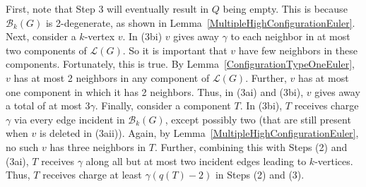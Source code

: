 \documentclass[12pt]{article}
\theoremstyle{plain}
\theoremstyle{definition}
\theoremstyle{remark}
\newcommand{\fancy}[1]{\mathcal{#1}}
\newcommand{\T}{\fancy{T}}
\newcommand{\B}{\fancy{B}}
\renewcommand{\L}{\fancy{L}}
\newcommand{\HH}{\fancy{H}}
\newcommand{\ch}{\operatorname{ch}}
\begin{document}
First, note that Step 3 will eventually result in $Q$ being empty.  This is
because $\B_k(G)$ is 2-degenerate, as shown in
Lemma~\ref{MultipleHighConfigurationEuler}.  Next, consider a $k$-vertex $v$. 
In (3bi) $v$ gives away $\gamma$ to each neighbor in at most two components of
$\L(G)$.  So it is important that $v$ have few neighbors in these components. 
Fortunately, this is true.  By Lemma~\ref{ConfigurationTypeOneEuler}, $v$ has
at most 2 neighbors in any component of $\L(G)$.  Further, $v$ has at most one
component in which  it has 2 neighbors.  Thus, in (3ai) and (3bi), $v$ gives
away a total of at most $3\gamma$.  Finally, consider a component $T$.  In
(3bi), $T$ receives charge $\gamma$ via every edge incident in $\B_k(G)$,
except possibly two (that are still present when $v$ is deleted in (3aii)). 
Again, by Lemma~\ref{MultipleHighConfigurationEuler}, no such $v$ has three
neighbors in $T$.  Further, combining this with Steps (2) and (3ai), $T$
receives $\gamma$ along all but at most two incident edges leading to
$k$-vertices.  Thus, $T$ receives charge at least $\gamma(q(T)-2)$ in Steps (2)
and (3).


\end{document}
